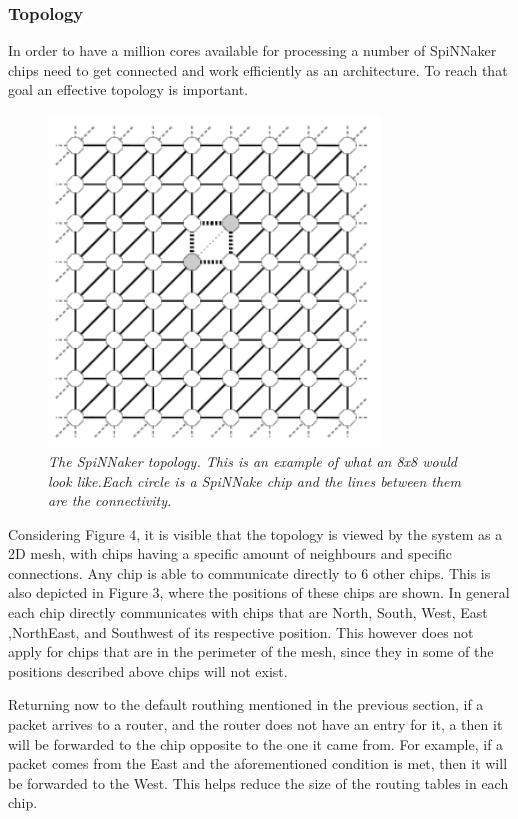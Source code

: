 \documentclass[12pt,a4paper]{article}
\begin{document}
\subsubsection{Topology}
In order to have a million cores available for processing a number of SpiNNaker chips need to get connected and work efficiently as an architecture. To reach that goal an effective topology is important.
\begin{figure}[h!]
\includegraphics[width=250pt,height=250pt,scale=2]{Pics/topology.png}
\centering
\caption{
\emph{The SpiNNaker topology\cite{navaridas2009understanding}. This is an example of what an 8x8 would look like.Each circle is a SpiNNake chip and the lines between them are the connectivity.}}
\end{figure}
\vspace{20pt}
Considering Figure 4, it is visible that the topology is viewed by the system as a 2D mesh, with chips having a specific amount of neighbours and specific connections. Any chip is able to communicate directly to 6 other chips. This is also depicted in Figure 3, where the positions of these chips are shown. In general each chip directly communicates with chips that are North, South, West, East ,NorthEast, and Southwest of its respective position. This however does not apply for chips that are in the perimeter of the mesh, since they in some of the positions described above chips will not exist. 

Returning now to the default routhing mentioned in the previous section, if a packet arrives to a router, and the router does not have an entry for it, a then it will be forwarded to the chip opposite to the one it came from. For example, if a packet comes from the East and the aforementioned condition is met, then it will be forwarded to the West. This helps reduce the size of the routing tables in each chip\cite{khan2008spinnaker}.
\end{document}
